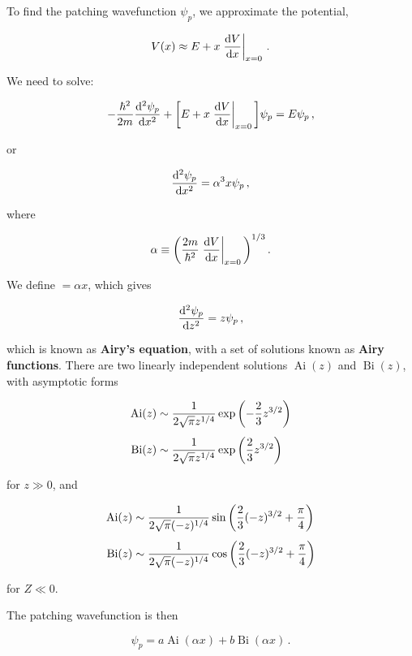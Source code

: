 \documentclass[12pt, titlepage]{article}
\DeclareMathOperator{\Ai}{Ai} %
\DeclareMathOperator{\Bi}{Bi} %
\begin{document}
To find the patching wavefunction $\psi_p$, we approximate the potential,

\begin{equation}
	V(x) \approx E + x\eval{\dv{V}{x}}_{x=0} \,.
\end{equation}

We need to solve:

\begin{equation*}
	-\frac{\hbar^2}{2m}\dv[2]{\psi_p}{x} + \qty[E + x\eval{\dv{V}{x}}_{x=0}\,]\psi_p = E\psi_p \,,
\end{equation*}

or

\begin{equation}
	\dv[2]{\psi_p}{x} = \alpha^3 x \psi_p \,,
\end{equation}

where

\begin{equation}
	\alpha \equiv \qty(\frac{2m}{\hbar^2}\eval{\dv{V}{x}}_{x=0}\,)^{1/3} \,.
\end{equation}

We define $ = \alpha x$, which gives

\begin{equation}
	\dv[2]{\psi_p}{z} = z\psi_p \,,
\end{equation}

which is known as \textbf{Airy's equation}, with a set of solutions known as \textbf{Airy functions}. There are two linearly independent solutions $\Ai(z)$ and $\Bi(z)$, with asymptotic forms

\begin{align*}
	\Ai(z) &\sim \frac{1}{2\sqrt{\pi}z^{1/4}}\exp\qty(-\frac{2}{3}z^{3/2}) \\[4pt]
	\Bi(z) &\sim \frac{1}{2\sqrt{\pi}z^{1/4}}\exp\qty(\frac{2}{3}z^{3/2})
\end{align*}

for $z \gg 0$, and

\begin{align*}
\Ai(z) &\sim \frac{1}{2\sqrt{\pi}(-z)^{1/4}}\sin\qty(\frac{2}{3}(-z)^{3/2} + \frac{\pi}{4}) \\[4pt]
\Bi(z) &\sim \frac{1}{2\sqrt{\pi}(-z)^{1/4}}\cos\qty(\frac{2}{3}(-z)^{3/2} + \frac{\pi}{4})
\end{align*}

for $Z \ll 0$.

The patching wavefunction is then

\begin{equation}
	\psi_p = a \Ai(\alpha x) + b \Bi(\alpha x) \,.
\end{equation}
\end{document}
